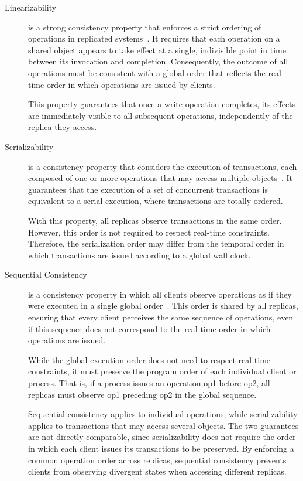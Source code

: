 \begin{description}
    \item[Linearizability] is a strong consistency property that enforces a strict ordering of operations in replicated
    systems~\cite{herlihy1990linearizability}. It requires that each operation on a shared object appears to take effect
    at a single, indivisible point in time between its invocation and completion. Consequently, the outcome of all
    operations must be consistent with a global order that reflects the real-time order in which operations are issued by
    clients.

          This property guarantees that once a write operation completes, its effects are immediately visible to all
          subsequent operations, independently of the replica they access.
    \item[Serializability] is a consistency property that considers the execution of transactions, each composed of one
    or more operations that may access multiple objects~\cite{papadimitriou1979serializability}. It guarantees that the
    execution of a set of concurrent transactions is equivalent to a serial execution, where transactions are totally
    ordered.

          With this property, all replicas observe transactions in the same order. However, this order is not
          required to respect real-time constraints. Therefore, the serialization order may differ from the temporal
          order in which transactions are issued according to a global wall clock.
    \item[Sequential Consistency] is a consistency property in which all clients observe operations as if they were
    executed in a single global order~\cite{lamport1979sequential}. This order is shared by all replicas, ensuring that every client perceives the
    same sequence of operations, even if this sequence does not correspond to the real-time order in which operations
    are issued.

          While the global execution order does not need to respect real-time constraints, it must preserve the program
          order of each individual client or process. That is, if a process issues an operation op1 before op2, all
          replicas must observe op1 preceding op2 in the global sequence.

          Sequential consistency applies to individual operations, while serializability applies to transactions that may
          access several objects. The two guarantees are not directly comparable, since serializability does not require the
          order in which each client issues its transactions to be preserved. By enforcing a common operation order across
          replicas, sequential consistency prevents clients from observing divergent states when accessing different
          replicas.
\end{description}

